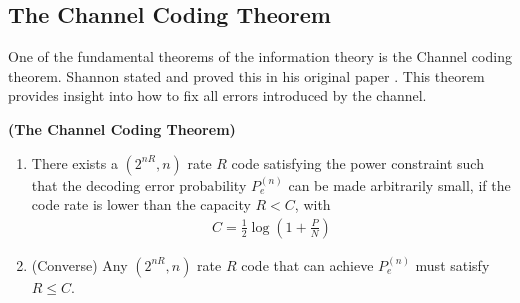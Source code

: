 \subsection{The Channel Coding Theorem}
One of the fundamental theorems of the information theory is the Channel coding theorem. Shannon stated and proved this in his original paper \cite{shannon1948}. This theorem provides insight into how to fix all errors introduced by the channel.
%
\begin{tcolorbox}[boxrule=0pt,frame hidden,sharp corners,enhanced, opacityback=0, borderline west={2pt}{0pt}{blue}]
\begin{thm} \textbf{(The Channel Coding Theorem)}
\begin{enumerate}
    \item There exists a $(2^{nR},n)$ rate $R$ code satisfying the power constraint such that the decoding error probability $P_e^{(n)}$ can be made arbitrarily small, if the code rate is lower than the capacity $R<C$, with
    \begin{eqnarray}
        C = \frac{1}{2}\log(1+\frac{P}{N})
    \end{eqnarray}
    \item (Converse) Any $(2^{nR},n)$ rate $R$ code that can achieve $P_e^{(n)}$ must satisfy $R\leq C$.
\end{enumerate}
\end{thm}
\end{tcolorbox}
%